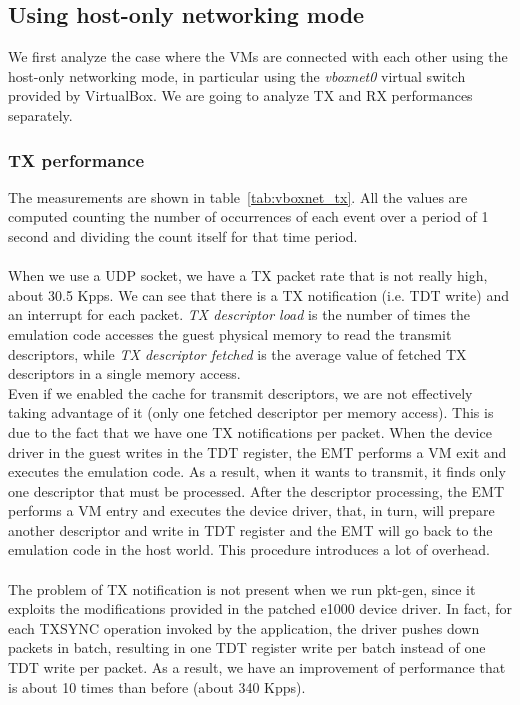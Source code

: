 \documentclass[a4paper, 12pt, titlepage]{report}
\begin{document}
\subsection{Using host-only networking mode}
We first analyze the case where the VMs are connected with each other using the host-only networking mode, in particular using the \textit{vboxnet0} virtual switch provided by VirtualBox. We are going to analyze TX and RX performances separately.
\subsubsection{TX performance}
The measurements are shown in table~\ref{tab:vboxnet_tx}. All the values are computed counting the number of occurrences of each event over a period of 1 second and dividing the count itself for that time period.
\\
\\
When we use a UDP socket, we have a TX packet rate that is not really high, about 30.5 Kpps. We can see that there is a TX notification (i.e. TDT write) and an interrupt for each packet. \textit{TX descriptor load} is the number of times the emulation code accesses the guest physical memory to read the transmit descriptors, while \textit{TX descriptor fetched} is the average value of fetched TX descriptors in a single memory access.
\\
Even if we enabled the cache for transmit descriptors, we are not effectively taking advantage of it (only one fetched descriptor per memory access). This is due to the fact that we have one TX notifications per packet. When the device driver in the guest writes in the TDT register, the EMT performs a VM exit and executes the emulation code. As a result, when it wants to transmit, it finds only one descriptor that must be processed. After the descriptor processing, the EMT performs a VM entry and executes the device driver, that, in turn, will prepare another descriptor and write in TDT register and the EMT will go back to the emulation code in the host world. This procedure introduces a lot of overhead.
\\
\\
The problem of TX notification is not present when we run pkt-gen, since it exploits the modifications provided in the patched e1000 device driver. In fact, for each TXSYNC operation invoked by the application, the driver pushes down packets in batch, resulting in one TDT register write per batch instead of one TDT write per packet. As a result, we have an improvement of performance that is about 10 times than before (about 340 Kpps).
\end{document}
